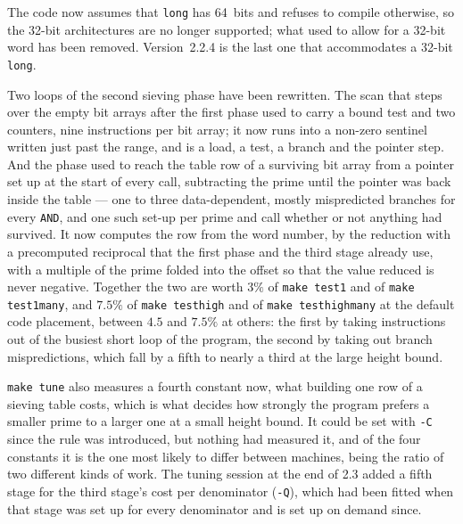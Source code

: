 \documentclass[12pt,a4paper,oneside]{amsart}
\begin{document}
The code now assumes that \texttt{long} has 64~bits and refuses to compile
otherwise, so the 32-bit architectures are no longer supported; what used
to allow for a 32-bit word has been removed. Version~2.2.4 is the last one
that accommodates a 32-bit \texttt{long}.

Two loops of the second sieving phase have been rewritten. The scan that
steps over the empty bit arrays after the first phase used to carry a bound
test and two counters, nine instructions per bit array; it now runs into a
non-zero sentinel written just past the range, and is a load, a test, a
branch and the pointer step. And the phase used to reach the table row of a surviving bit array
from a pointer set up at the start of every call, subtracting the prime until
the pointer was back inside the table --- one to three data-dependent, mostly
mispredicted branches for every \texttt{AND}, and one such set-up per prime
and call whether or not anything had survived. It now computes the row from
the word number, by the reduction with a precomputed reciprocal that the
first phase and the third stage already use, with a multiple of the prime
folded into the offset so that the value reduced is never negative. Together
the two are worth $3\%$ of \texttt{make test1} and of \texttt{make
test1many}, and $7.5\%$ of \texttt{make testhigh} and of \texttt{make
testhighmany} at the default code placement, between $4.5$ and $7.5\%$ at
others: the first by taking instructions out of the busiest short loop of
the program, the second by taking out branch mispredictions, which fall by a
fifth to nearly a third at the large height bound.

\texttt{make tune} also measures a fourth constant now, what building one
row of a sieving table costs, which is what decides how strongly the program
prefers a smaller prime to a larger one at a small height bound. It could be
set with \verb+-C+ since the rule was introduced, but nothing had measured
it, and of the four constants it is the one most likely to differ between
machines, being the ratio of two different kinds of work. The tuning session
at the end of 2.3 added a fifth stage for the third stage's cost per
denominator (\verb+-Q+), which had been fitted when that stage was set up
for every denominator and is set up on demand since.
\end{document}
